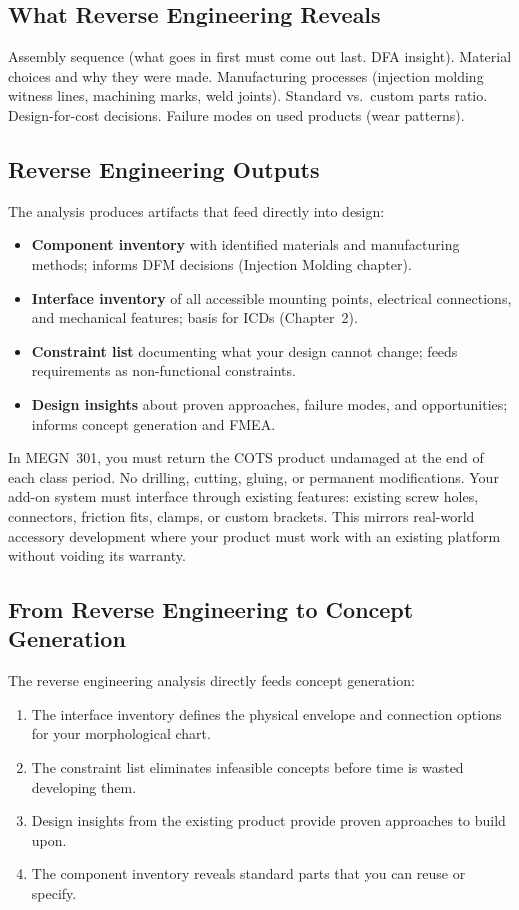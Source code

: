 \documentclass[11pt,letterpaper,twoside,openany]{book}
\begin{document}
\subsection{What Reverse Engineering Reveals}
Assembly sequence (what goes in first must come out last. DFA insight). Material choices and why they were made. Manufacturing processes (injection molding witness lines, machining marks, weld joints). Standard vs.\ custom parts ratio. Design-for-cost decisions. Failure modes on used products (wear patterns).


\subsection{Reverse Engineering Outputs}
The analysis produces artifacts that feed directly into design:
\begin{itemize}[leftmargin=1.5em]
\item \textbf{Component inventory} with identified materials and manufacturing methods; informs DFM decisions (Injection Molding chapter).
\item \textbf{Interface inventory} of all accessible mounting points, electrical connections, and mechanical features; basis for ICDs (Chapter~2).
\item \textbf{Constraint list} documenting what your design cannot change; feeds requirements as non-functional constraints.
\item \textbf{Design insights} about proven approaches, failure modes, and opportunities; informs concept generation and FMEA.
\end{itemize}

\begin{tipbox}
In MEGN~301, you must return the COTS product undamaged at the end of each class period. No drilling, cutting, gluing, or permanent modifications. Your add-on system must interface through existing features: existing screw holes, connectors, friction fits, clamps, or custom brackets. This mirrors real-world accessory development where your product must work with an existing platform without voiding its warranty.
\end{tipbox}

\subsection{From Reverse Engineering to Concept Generation}
The reverse engineering analysis directly feeds concept generation:
\begin{enumerate}[nosep,leftmargin=1.5em]
\item The interface inventory defines the physical envelope and connection options for your morphological chart.
\item The constraint list eliminates infeasible concepts before time is wasted developing them.
\item Design insights from the existing product provide proven approaches to build upon.
\item The component inventory reveals standard parts that you can reuse or specify.
\end{enumerate}
\end{document}
